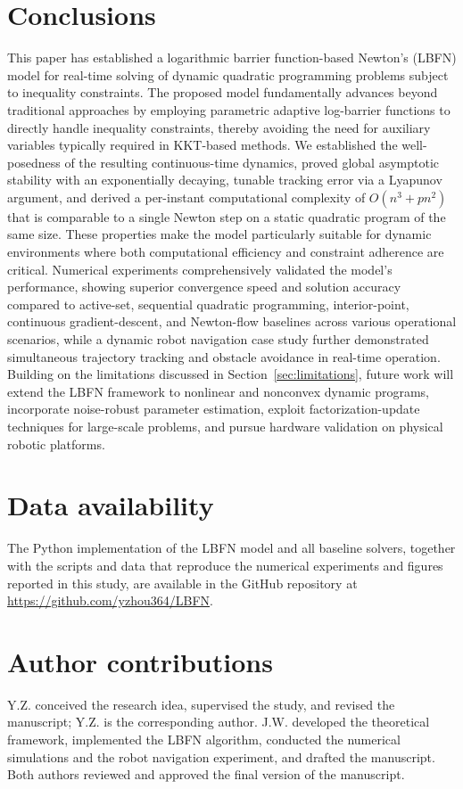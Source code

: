 \documentclass[fleqn,10pt]{wlscirep}
\begin{document}
\section{Conclusions}
This paper has established a logarithmic barrier function-based Newton's (LBFN) model for real-time solving of dynamic quadratic programming problems subject to inequality constraints. The proposed model fundamentally advances beyond traditional approaches by employing parametric adaptive log-barrier functions to directly handle inequality constraints, thereby avoiding the need for auxiliary variables typically required in KKT-based methods. We established the well-posedness of the resulting continuous-time dynamics, proved global asymptotic stability with an exponentially decaying, tunable tracking error via a Lyapunov argument, and derived a per-instant computational complexity of $O(n^3+pn^2)$ that is comparable to a single Newton step on a static quadratic program of the same size. These properties make the model particularly suitable for dynamic environments where both computational efficiency and constraint adherence are critical. Numerical experiments comprehensively validated the model's performance, showing superior convergence speed and solution accuracy compared to active-set, sequential quadratic programming, interior-point, continuous gradient-descent, and Newton-flow baselines across various operational scenarios, while a dynamic robot navigation case study further demonstrated simultaneous trajectory tracking and obstacle avoidance in real-time operation. Building on the limitations discussed in Section~\ref{sec:limitations}, future work will extend the LBFN framework to nonlinear and nonconvex dynamic programs, incorporate noise-robust parameter estimation, exploit factorization-update techniques for large-scale problems, and pursue hardware validation on physical robotic platforms.


\section*{Data availability}
The Python implementation of the LBFN model and all baseline solvers, together with the scripts and data that reproduce the numerical experiments and figures reported in this study, are available in the GitHub repository at \url{https://github.com/yzhou364/LBFN}.

\section*{Author contributions}
Y.Z. conceived the research idea, supervised the study, and revised the manuscript; Y.Z. is the corresponding author. J.W. developed the theoretical framework, implemented the LBFN algorithm, conducted the numerical simulations and the robot navigation experiment, and drafted the manuscript. Both authors reviewed and approved the final version of the manuscript.
\end{document}
